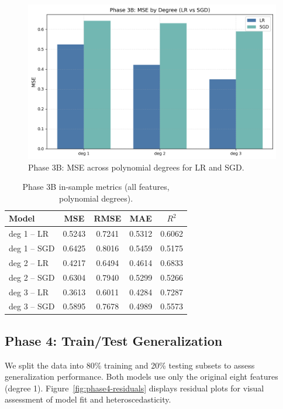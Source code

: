 \documentclass[runningheads]{llncs}
\begin{document}
\begin{figure}[H]
  \centering
  \includegraphics[width=0.9\linewidth]{data/Phase 3B MSE.png}
  \caption{Phase 3B: MSE across polynomial degrees for LR and SGD.}
  \label{fig:3b-mse}
\end{figure}

\begin{table}[H]
  \centering
  \caption{Phase 3B in-sample metrics (all features, polynomial degrees).}
  \label{tab:3b}
  \begin{tabular}{lcccc}
    \toprule
    Model & MSE & RMSE & MAE & $R^2$ \\
    \midrule
    deg 1 -- LR  & 0.5243 & 0.7241 & 0.5312 & 0.6062 \\
    deg 1 -- SGD & 0.6425 & 0.8016 & 0.5459 & 0.5175 \\
    deg 2 -- LR  & 0.4217 & 0.6494 & 0.4614 & 0.6833 \\
    deg 2 -- SGD & 0.6304 & 0.7940 & 0.5299 & 0.5266 \\
    deg 3 -- LR  & 0.3613 & 0.6011 & 0.4284 & 0.7287 \\
    deg 3 -- SGD & 0.5895 & 0.7678 & 0.4989 & 0.5573 \\
    \bottomrule
  \end{tabular}
\end{table}

\subsection{Phase 4: Train/Test Generalization}
We split the data into 80\% training and 20\% testing subsets to assess generalization performance. Both models use only the original eight features (degree 1). Figure~\ref{fig:phase4-residuals} displays residual plots for visual assessment of model fit and heteroscedasticity.
\end{document}
